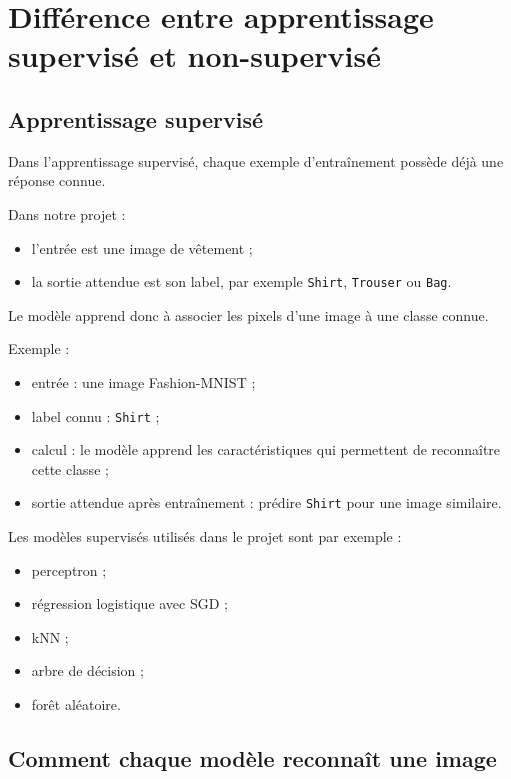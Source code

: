 \documentclass[11pt,a4paper]{article}
\begin{document}
\section{Différence entre apprentissage supervisé et non-supervisé}

\subsection{Apprentissage supervisé}

Dans l'apprentissage supervisé, chaque exemple d'entraînement possède déjà une réponse connue.

Dans notre projet :

\begin{itemize}
\item l'entrée est une image de vêtement ;
\item la sortie attendue est son label, par exemple \texttt{Shirt}, \texttt{Trouser} ou \texttt{Bag}.
\end{itemize}

Le modèle apprend donc à associer les pixels d'une image à une classe connue.

Exemple :

\begin{itemize}
\item entrée : une image Fashion-MNIST ;
\item label connu : \texttt{Shirt} ;
\item calcul : le modèle apprend les caractéristiques qui permettent de reconnaître cette classe ;
\item sortie attendue après entraînement : prédire \texttt{Shirt} pour une image similaire.
\end{itemize}

Les modèles supervisés utilisés dans le projet sont par exemple :

\begin{itemize}
\item perceptron ;
\item régression logistique avec SGD ;
\item kNN ;
\item arbre de décision ;
\item forêt aléatoire.
\end{itemize}

\subsection{Comment chaque modèle reconnaît une image}
\end{document}
